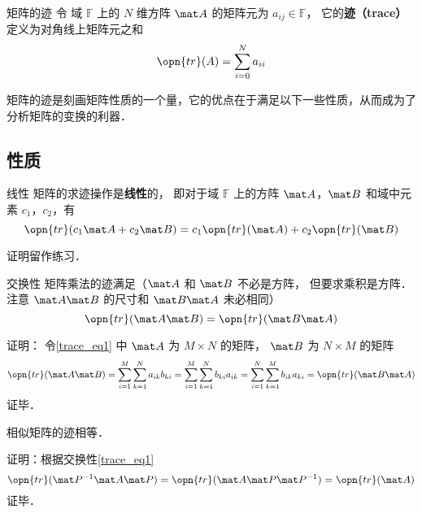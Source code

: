 


\begin{definition}{矩阵的迹}
令 域 $\mathbb{F}$ 上的 $N$ 维方阵 $\mat A$ 的矩阵元为 $a_{ij}\in\mathbb{F}$， 它的\textbf{迹（trace）}定义为对角线上矩阵元之和
\begin{equation}
\opn{tr}(A) = \sum_{i=0}^N a_{ii}
\end{equation}
\end{definition}

矩阵的迹是刻画矩阵性质的一个量，它的优点在于满足以下一些性质，从而成为了分析矩阵的变换的利器．


\subsection{性质}
\begin{theorem}{线性}
矩阵的求迹操作是\textbf{线性}的， 即对于域 $\mathbb{F}$ 上的方阵 $\mat A$，$\mat B$ 和域中元素 $c_1$，$c_2$，有
\begin{equation}
\opn{tr}(c_1\mat A+c_2\mat B) = c_1\opn{tr}(\mat A) + c_2\opn{tr}(\mat B)
\end{equation}
\end{theorem}
证明留作练习．

\begin{theorem}{交换性}\label{trace_the1}
矩阵乘法的迹满足（$\mat A$ 和 $\mat B$ 不必是方阵， 但要求乘积是方阵． 注意 $\mat A\mat B$ 的尺寸和 $\mat B\mat A$ 未必相同）
\begin{equation}\label{trace_eq1}
\opn{tr}(\mat A\mat B) = \opn{tr}(\mat B\mat A)
\end{equation}
\end{theorem}
证明： 令\autoref{trace_eq1} 中 $\mat A$ 为 $M\times N$ 的矩阵， $\mat B$ 为 $N\times M$ 的矩阵
\begin{equation}
\opn{tr}(\mat A\mat B) = \sum_{i=1}^M \sum_{k=1}^N a_{ik}b_{ki} = \sum_{i=1}^M \sum_{k=1}^N b_{ki}a_{ik} = \sum_{i=1}^N \sum_{k=1}^M b_{ik}a_{ki} = \opn{tr}(\mat B\mat A)
\end{equation}
证毕．

\begin{theorem}{}
相似矩阵的迹相等．
\end{theorem}
证明：根据交换性\autoref{trace_eq1} 
$$\opn{tr}(\mat P^{-1}\mat A\mat P) = \opn{tr}(\mat A\mat P\mat P^{-1}) = \opn{tr}(\mat A)$$
证毕．


